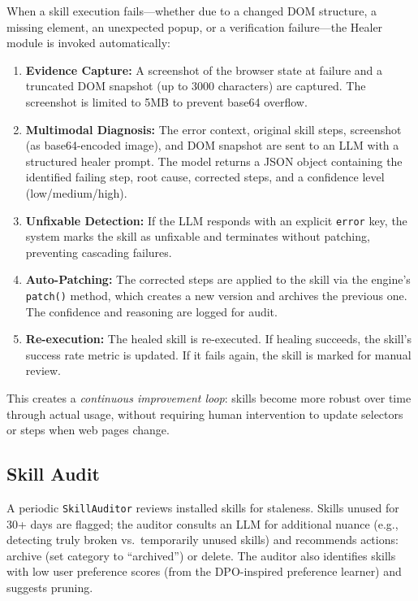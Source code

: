 When a skill execution fails---whether due to a changed DOM structure, a missing element, an unexpected popup, or a verification failure---the Healer module is invoked automatically:

\begin{enumerate}[leftmargin=*,itemsep=1pt]
    \item \textbf{Evidence Capture:} A screenshot of the browser state at failure and a truncated DOM snapshot (up to 3000 characters) are captured. The screenshot is limited to 5MB to prevent base64 overflow.
    \item \textbf{Multimodal Diagnosis:} The error context, original skill steps, screenshot (as base64-encoded image), and DOM snapshot are sent to an LLM with a structured healer prompt. The model returns a JSON object containing the identified failing step, root cause, corrected steps, and a confidence level (low/medium/high).
    \item \textbf{Unfixable Detection:} If the LLM responds with an explicit \texttt{error} key, the system marks the skill as unfixable and terminates without patching, preventing cascading failures.
    \item \textbf{Auto-Patching:} The corrected steps are applied to the skill via the engine's \texttt{patch()} method, which creates a new version and archives the previous one. The confidence and reasoning are logged for audit.
    \item \textbf{Re-execution:} The healed skill is re-executed. If healing succeeds, the skill's success rate metric is updated. If it fails again, the skill is marked for manual review.
\end{enumerate}

This creates a \emph{continuous improvement loop}: skills become more robust over time through actual usage, without requiring human intervention to update selectors or steps when web pages change.

\subsection{Skill Audit}

A periodic \texttt{SkillAuditor} reviews installed skills for staleness. Skills unused for 30+ days are flagged; the auditor consults an LLM for additional nuance (e.g., detecting truly broken vs.\ temporarily unused skills) and recommends actions: archive (set category to ``archived'') or delete. The auditor also identifies skills with low user preference scores (from the DPO-inspired preference learner) and suggests pruning.
